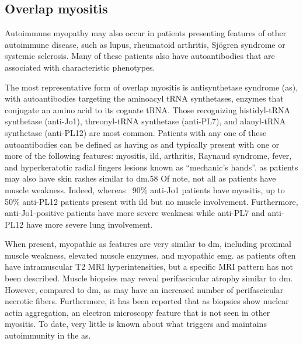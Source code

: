 \subsection{Overlap myositis}

Autoimmune myopathy may also occur in patients presenting features of other autoimmune disease, such as lupus, rheumatoid arthritis, Sjögren syndrome or systemic sclerosis.\cite{GuillenDelCastillo2014,Rigolet2012,EscolaVerge2017} Many of these patients also have autoantibodies that are associated with characteristic phenotypes.\cite{GuillenDelCastillo2014,Rigolet2012,EscolaVerge2017}

The most representative form of overlap myositis is antisynthetase syndrome (\gls{as}), with autoantibodies targeting the aminoacyl tRNA synthetases, enzymes that conjugate an amino acid to its cognate tRNA.\cite{PinalFernandez2017a,TralleroAraguas2016} Those recognizing histidyl-tRNA synthetase (anti-Jo1), threonyl-tRNA synthetase (anti-PL7), and alanyl-tRNA synthetase (anti-PL12) are most common.\cite{PinalFernandez2017a,TralleroAraguas2016} Patients with any one of these autoantibodies can be defined as having \gls{as} and typically present with one or more of the following features: myositis, \gls{ild}, arthritis, Raynaud syndrome, fever, and hyperkeratotic radial fingers lesions known as “mechanic’s hands”.\cite{SelvaOCallaghan2018} \gls{as} patients may also have skin rashes similar to \gls{dm}.58 Of note, not all \gls{as} patients have muscle weakness. Indeed, whereas ~90\% anti-Jo1 patients have myositis, up to 50\% anti-PL12 patients present with \gls{ild} but no muscle involvement.\cite{PinalFernandez2017a} Furthermore, anti-Jo1-positive patients have more severe weakness while anti-PL7 and anti-PL12 have more severe lung involvement.\cite{PinalFernandez2017a,TralleroAraguas2016}

When present, myopathic \gls{as} features are very similar to \gls{dm}, including proximal muscle weakness, elevated muscle enzymes, and myopathic \gls{emg}.\cite{SelvaOCallaghan2018} \gls{as} patients often have intramuscular T2 MRI hyperintensities, but a specific MRI pattern has not been described.\cite{Andersson2017} Muscle biopsies may reveal perifascicular atrophy similar to \gls{dm}. However, compared to \gls{dm}, \gls{as} may have an increased number of perifascicular necrotic fibers.\cite{MescamMancini2015,Noguchi2017} Furthermore, it has been reported that \gls{as} biopsies show nuclear actin aggregation, an electron microscopy feature that is not seen in other myositis.\cite{Stenzel2015} To date, very little is known about what triggers and maintains autoimmunity in the \gls{as}.

